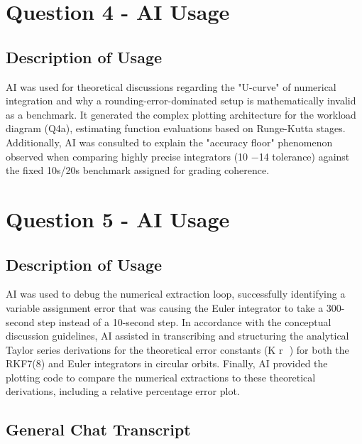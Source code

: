 \documentclass[a4paper,12pt]{article}
\begin{document}
\section*{Question 4 - AI Usage}

\subsection*{Description of Usage}
AI was used for theoretical discussions regarding the "U-curve" of numerical integration and why a rounding-error-dominated setup is mathematically invalid as a benchmark. It generated the complex plotting architecture for the workload diagram (Q4a), estimating function evaluations based on Runge-Kutta stages. Additionally, AI was consulted to explain the "accuracy floor" phenomenon observed when comparing highly precise integrators (10 
−14
  tolerance) against the fixed 10s/20s benchmark assigned for grading coherence.

\section*{Question 5 - AI Usage}

\subsection*{Description of Usage}
AI was used to debug the numerical extraction loop, successfully identifying a variable assignment error that was causing the Euler integrator to take a 300-second step instead of a 10-second step. In accordance with the conceptual discussion guidelines, AI assisted in transcribing and structuring the analytical Taylor series derivations for the theoretical error constants (K 
r
​
 ) for both the RKF7(8) and Euler integrators in circular orbits. Finally, AI provided the plotting code to compare the numerical extractions to these theoretical derivations, including a relative percentage error plot.
\subsection*{General Chat Transcript}


\end{document}
